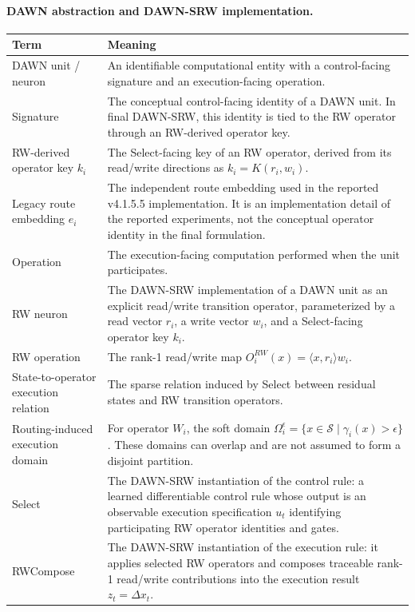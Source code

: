 \documentclass{article}
\begin{document}
\noindent\begin{minipage}{\textwidth}
\paragraph{DAWN abstraction and DAWN-SRW implementation.}
\vspace{-0.35em}
\begin{center}
\small
\setlength{\tabcolsep}{5pt}
\renewcommand{\arraystretch}{1.06}
\begin{tabularx}{\textwidth}{lX}
\toprule
\textbf{Term} & \textbf{Meaning} \\
\midrule
DAWN unit / neuron & An identifiable computational entity with a control-facing signature and an execution-facing operation. \\
Signature & The conceptual control-facing identity of a DAWN unit. In final DAWN-SRW, this identity is tied to the RW operator through an RW-derived operator key. \\
RW-derived operator key \(k_i\) & The Select-facing key of an RW operator, derived from its read/write directions as \(k_i=K(r_i,w_i)\). \\
Legacy route embedding \(e_i\) & The independent route embedding used in the reported v4.1.5.5 implementation. It is an implementation detail of the reported experiments, not the conceptual operator identity in the final formulation. \\
Operation & The execution-facing computation performed when the unit participates. \\
RW neuron & The DAWN-SRW implementation of a DAWN unit as an explicit read/write transition operator, parameterized by a read vector \(r_i\), a write vector \(w_i\), and a Select-facing operator key \(k_i\). \\
RW operation & The rank-1 read/write map \(O_i^{RW}(x)=\langle x,r_i\rangle w_i\). \\
State-to-operator execution relation & The sparse relation induced by Select between residual states and RW transition operators. \\
Routing-induced execution domain & For operator \(W_i\), the soft domain \(\Omega_i^\epsilon=\{x\in\mathcal{S}\mid \gamma_i(x)>\epsilon\}\). These domains can overlap and are not assumed to form a disjoint partition. \\
Select & The DAWN-SRW instantiation of the control rule: a learned differentiable control rule whose output is an observable execution specification \(u_t\) identifying participating RW operator identities and gates. \\
RWCompose & The DAWN-SRW instantiation of the execution rule: it applies selected RW operators and composes traceable rank-1 read/write contributions into the execution result \(z_t=\Delta x_t\). \\
\bottomrule
\end{tabularx}
\end{center}
\end{minipage}
\par\medskip
\end{document}
